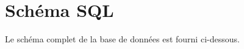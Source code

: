\chapter{Schéma SQL}

Le schéma complet de la base de données est fourni ci-dessous.

\begingroup
\lstset{basicstyle=\ttfamily\scriptsize,numbers=none}

\endgroup
